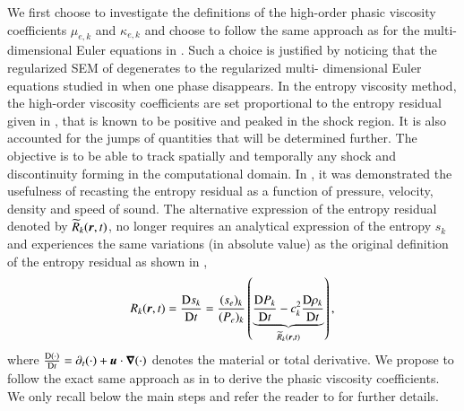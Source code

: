 \documentclass[preprint,10pt]{elsarticle}
\begin{document}
We first choose to investigate the definitions of the high-order phasic viscosity coefficients $\mu_{e,k}$ and $\kappa_{e,k}$ and choose to follow the same 
approach as for the multi-dimensional Euler equations in 
\cite{Marco_paper_low_mach}. Such a choice is justified by noticing that the regularized SEM of  degenerates to the regularized multi-
dimensional Euler equations studied in \cite{Marco_paper_low_mach} 
when one phase disappears. In the entropy viscosity method, the high-order viscosity coefficients are set proportional to the entropy residual given in 
, that is known to be positive and peaked in the 
shock region. It is also accounted for the jumps of quantities that will be determined further. The objective is to be able to track spatially and temporally any 
shock and discontinuity forming in the computational domain. 
In \cite{Marco_paper_low_mach}, it was demonstrated the usefulness of recasting the entropy residual as a function of pressure, velocity, density and speed of 
sound. The alternative expression of the entropy residual 
denoted by $\widetilde{R}_k(\boldsymbol r,t)$, no longer requires an analytical expression of the entropy $s_k$ and experiences the same variations (in absolute value) 
as the original definition of the entropy residual as shown in ,
%
\begin{equation}\label{eq:ent-res-sem}
R_k(\boldsymbol r,t)  = \frac{\textrm{D} s_k}{\textrm{D} t} = \frac{(s_e)_k}{(P_e)_k} \left( \underbrace{\frac{\textrm{D} P_k}{\textrm{D} t} - c_k^2 \frac{\textrm{D} \rho_k}{\textrm{D} t} }_{\widetilde{R}_k(\boldsymbol r,t)} \right) ,
\end{equation} 
%
where $\frac{\textrm{D} (\cdot)}{\textrm{D} t}=\partial_t (\cdot)+\boldsymbol u \cdot \boldsymbol\nabla (\cdot)$ denotes the material or total derivative. We propose to follow the exact same approach 
as in \cite{Marco_paper_low_mach} 
to derive the phasic viscosity coefficients. We only recall below the main steps and refer the reader to \cite{Marco_paper_low_mach} for further details.
\end{document}
